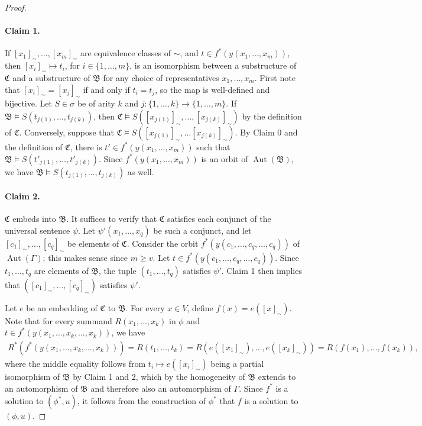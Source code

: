 \documentclass[10pt,a4paper]{amsart}
\DeclareMathOperator{\Aut}{Aut}
\newcommand{\bB}{{\mathfrak B}}
\newcommand{\bC}{{\mathfrak C}}
\begin{document}
\begin{proof}
\paragraph{Claim 1.} 
If $[x_1]_\sim,\dots,[x_m]_\sim$ are equivalence classes of $\sim$, and 
$t \in f^*(y(x_1,\dots,x_m))$, then $[x_i]_{\sim} \mapsto t_i$,
for $i \in \{1,\dots,m\}$, is an isomorphism
between a substructure of $\bC$ and a substructure of $\bB$ for any choice of representatives $x_1, \dots, x_m$. 
First note that $[x_i]_{\sim} = [x_j]_{\sim}$ if and only if $t_i = t_j$, so the map is well-defined and bijective. 
Let $S \in \sigma$ be of arity $k$ and 
$j \colon \{1, \dots, k\} \to \{1, \dots, m \}$. 
If $\bB \models S(t_{j(1)},\dots,t_{j(k)})$, 
then 
$\bC \models S([x_{j(1)}]_\sim,\dots,[x_{j(k)}]_\sim)$ by the definition of $\bC$. 
Conversely, suppose that 
$\bC \models S([x_{j(1)}]_\sim,\dots[x_{j(k)}]_\sim)$. 
By Claim 0 and the definition of $\bC$, there is $t' \in f^*(y(x_1,\dots,x_m))$ such that $\bB \models S(t'_{j(1)},\dots,t'_{j(k)})$. Since $f^*(y(x_1,\dots,x_m))$ is an orbit of $\Aut(\bB)$, we have $\bB \models S(t_{j(1)},\dots,t_{j(k)})$ as well.

\paragraph{Claim 2.} $\bC$ embeds into $\bB$. 
It suffices to verify that $\bC$ satisfies each conjunct of the universal sentence $\psi$. 
Let $\psi'(x_1,\dots,x_q)$ be such a conjunct, and let $[c_1]_\sim,\dots,[c_q]_\sim$ be elements of $\bC$. Consider the orbit $f^*(y(c_1,\dots,c_q,\dots,c_q))$ of $\Aut(\Gamma)$; this makes sense since $m \geq v$. Let $t \in f^*(y(c_1,\dots,c_q,\dots,c_q))$.
Since $t_1, \dots, t_q$ are elements of $\bB$, the tuple $(t_1,\dots,t_q)$ satisfies $\psi'$.
Claim 1 then implies that $([c_1]_\sim,\dots,[c_q]_\sim)$ satisfies $\psi'$. 

\medskip

Let $e$ be an embedding of $\bC$ to $\bB$. For every $x \in V$, define $f(x)=e([x]_\sim)$. Note that for every summand $R(x_1, \dots, x_k)$ in $\phi$ and $t \in f^*(y(x_1, \dots, x_k, \dots, x_k))$, we have
\begin{align*}
R^*(f^*(y(x_1, \dots, x_k, \dots, x_k)))  = R(t_1, \dots, t_k) = R(e([x_1]_\sim), \dots, e([x_k]_\sim)) = R(f(x_1), \dots, f(x_k)),
\end{align*}
where the middle equality follows from $t_i \mapsto e([x_i]_\sim)$ being a partial isomorphism of $\bB$ by Claim 1 and 2, which by the homogeneity of $\bB$ extends to an automorphism of $\bB$ and therefore also an automorphism of $\Gamma$.
Since $f^*$ is a solution to $(\phi^*,u)$, it follows from the construction of $\phi^*$ that $f$ is a solution to $(\phi,u)$.
\end{proof}
\end{document}

